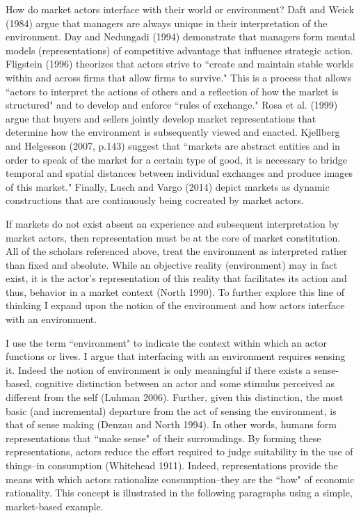 How do market actors interface with their world or environment? Daft and Weick (1984) argue that managers are always unique in their interpretation of the environment. Day and Nedungadi (1994) demonstrate that managers form mental models (representations) of competitive advantage that influence strategic action. Fligstein (1996) theorizes that actors strive to ``create and maintain stable worlds within and across firms that allow firms to survive." This is a process that allows ``actors to interpret the actions of others and a reflection of how the market is structured" and to develop and enforce ``rules of exchange."  Rosa et al. (1999) argue that buyers and sellers jointly develop market representations that determine how the environment is subsequently viewed and enacted. Kjellberg and Helgesson (2007, p.143) suggest that ``markets are abstract entities and in order to speak of the market for a certain type of good, it is necessary to bridge temporal and spatial distances between individual exchanges and produce images of this market." Finally, Lusch and Vargo (2014) depict markets as dynamic constructions that are continuously being cocreated by market actors. 

If markets do not exist absent an experience and subsequent interpretation by market actors, then representation must be at the core of market constitution. All of the scholars referenced above, treat the environment as interpreted rather than fixed and absolute. While an objective reality (environment) may in fact exist, it is the actor's representation of this reality that facilitates its action and thus, behavior in a market context (North 1990). To further explore this line of thinking I expand upon the notion of the environment and how actors interface with an environment. 

I use the term ``environment" to indicate the context within which an actor functions or lives. I argue that interfacing with an environment requires sensing it. Indeed the notion of environment is only meaningful if there exists a sense-based, cognitive distinction between an actor and some stimulus perceived as different from the self (Luhman 2006). Further, given this distinction, the most basic (and incremental) departure from the act of sensing the environment, is that of sense making (Denzau and North 1994). In other words, humans form representations that ``make sense" of their surroundings. By forming  these representations, actors reduce the effort required to judge suitability in the use of things--in consumption (Whitehead 1911). Indeed, representations provide the means with which actors rationalize consumption--they are the ``how" of economic rationality. This concept is illustrated in the following paragraphs using a simple, market-based example. 

